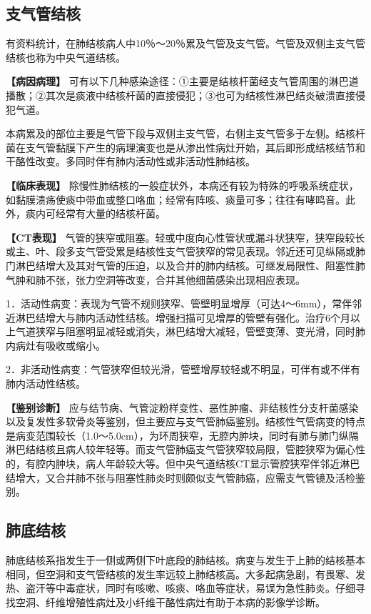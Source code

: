 \subsection{支气管结核}

有资料统计，在肺结核病人中10％～20％累及气管及支气管。气管及双侧主支气管结核也称为中央气道结核。

\textbf{【病因病理】}
可有以下几种感染途径：①主要是结核杆菌经支气管周围的淋巴道播散；②其次是痰液中结核杆菌的直接侵犯；③也可为结核性淋巴结炎破溃直接侵犯气道。

本病累及的部位主要是气管下段与双侧主支气管，右侧主支气管多于左侧。结核杆菌在支气管黏膜下产生的病理演变也是从渗出性病灶开始，其后即形成结核结节和干酪性改变。多同时伴有肺内活动性或非活动性肺结核。

\textbf{【临床表现】}
除慢性肺结核的一般症状外，本病还有较为特殊的呼吸系统症状，如黏膜溃疡使痰中带血或整口咯血；经常有阵咳、痰量可多；往往有哮鸣音。此外，痰内可经常有大量的结核杆菌。

\textbf{【CT表现】}
气管的狭窄或阻塞。轻或中度向心性管状或漏斗状狭窄，狭窄段较长或主、叶、段多支气管受累是结核性支气管狭窄的常见表现。邻近还可见纵隔或肺门淋巴结增大及其对气管的压迫，以及合并的肺内结核。可继发局限性、阻塞性肺气肿和肺不张，张力空洞等改变，合并其他细菌感染出现相应表现。

1．活动性病变：表现为气管不规则狭窄、管壁明显增厚（可达4～6mm），常伴邻近淋巴结增大与肺内活动性结核。增强扫描可见增厚的管壁有强化。治疗6个月以上气道狭窄与阻塞明显减轻或消失，淋巴结增大减轻，管壁变薄、变光滑，同时肺内病灶有吸收或缩小。

2．非活动性病变：气管狭窄但较光滑，管壁增厚较轻或不明显，可伴有或不伴有肺内活动性结核。

\textbf{【鉴别诊断】}
应与结节病、气管淀粉样变性、恶性肿瘤、非结核性分支杆菌感染以及复发性多软骨炎等鉴别，但主要应与支气管肺癌鉴别。结核性气管病变的特点是病变范围较长（1.0～5.0cm），为环周狭窄，无腔内肿块，同时有肺与肺门纵隔淋巴结结核且病人较年轻等。而支气管肺癌支气管狭窄较局限，管腔狭窄为偏心性的，有腔内肿块，病人年龄较大等。但中央气道结核CT显示管腔狭窄伴邻近淋巴结增大，又合并肺不张与阻塞性肺炎时则颇似支气管肺癌，应需支气管镜及活检鉴别。

\subsection{肺底结核}

肺底结核系指发生于一侧或两侧下叶底段的肺结核。病变与发生于上肺的结核基本相同，但空洞和支气管结核的发生率远较上肺结核高。大多起病急剧，有畏寒、发热、盗汗等中毒症状，同时有咳嗽、咳痰、咯血等症状，易误为急性肺炎。仔细寻找空洞、纤维增殖性病灶及小纤维干酪性病灶有助于本病的影像学诊断。

